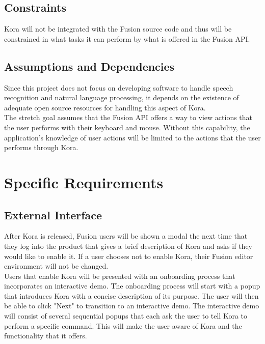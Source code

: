 \documentclass[onecolumn, draftclsnofoot,10pt, compsoc]{IEEEtran}
\def \botname{Kora\xspace}
\begin{document}
    \subsection{Constraints}
        \botname will not be integrated with the Fusion source code and thus will be constrained in what tasks it can perform by what is offered in the Fusion API. 

    \subsection{Assumptions and Dependencies}
        Since this project does not focus on developing software to handle speech recognition and natural language processing, it depends on the existence of adequate open source resources for handling this aspect of \botname. \\

        The stretch goal assumes that the Fusion API offers a way to view actions that the user performs with their keyboard and mouse.
        Without this capability, the application's knowledge of user actions will be limited to the actions that the user performs through \botname.

\section{Specific Requirements}
    \subsection{External Interface}
       After \botname is released, Fusion users will be shown a modal the next time that they log into the product that gives a brief description of \botname and asks if they would like to enable it.
       If a user chooses not to enable \botname, their Fusion editor environment will not be changed. \\

       Users that enable \botname will be presented with an onboarding process that incorporates an interactive demo.
       The onboarding process will start with a popup that introduces \botname with a concise description of its purpose.
       The user will then be able to click "Next" to transition to an interactive demo.
       The interactive demo will consist of several sequential popups that each ask the user to tell \botname to perform a specific command.
       This will make the user aware of \botname and the functionality that it offers.
\end{document}
